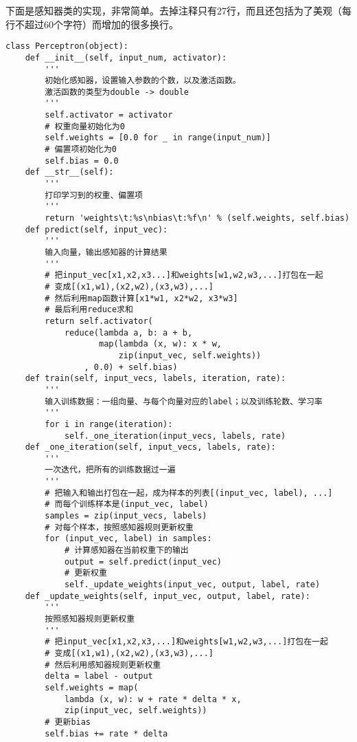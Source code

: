 下面是感知器类的实现，非常简单。去掉注释只有27行，而且还包括为了美观（每行不超过60个字符）而增加的很多换行。
\begin{lstlisting}
class Perceptron(object):
    def __init__(self, input_num, activator):
        '''
        初始化感知器，设置输入参数的个数，以及激活函数。
        激活函数的类型为double -> double
        '''
        self.activator = activator
        # 权重向量初始化为0
        self.weights = [0.0 for _ in range(input_num)]
        # 偏置项初始化为0
        self.bias = 0.0
    def __str__(self):
        '''
        打印学习到的权重、偏置项
        '''
        return 'weights\t:%s\nbias\t:%f\n' % (self.weights, self.bias)
    def predict(self, input_vec):
        '''
        输入向量，输出感知器的计算结果
        '''
        # 把input_vec[x1,x2,x3...]和weights[w1,w2,w3,...]打包在一起
        # 变成[(x1,w1),(x2,w2),(x3,w3),...]
        # 然后利用map函数计算[x1*w1, x2*w2, x3*w3]
        # 最后利用reduce求和
        return self.activator(
            reduce(lambda a, b: a + b,
                   map(lambda (x, w): x * w,  
                       zip(input_vec, self.weights))
                , 0.0) + self.bias)
    def train(self, input_vecs, labels, iteration, rate):
        '''
        输入训练数据：一组向量、与每个向量对应的label；以及训练轮数、学习率
        '''
        for i in range(iteration):
            self._one_iteration(input_vecs, labels, rate)
    def _one_iteration(self, input_vecs, labels, rate):
        '''
        一次迭代，把所有的训练数据过一遍
        '''
        # 把输入和输出打包在一起，成为样本的列表[(input_vec, label), ...]
        # 而每个训练样本是(input_vec, label)
        samples = zip(input_vecs, labels)
        # 对每个样本，按照感知器规则更新权重
        for (input_vec, label) in samples:
            # 计算感知器在当前权重下的输出
            output = self.predict(input_vec)
            # 更新权重
            self._update_weights(input_vec, output, label, rate)
    def _update_weights(self, input_vec, output, label, rate):
        '''
        按照感知器规则更新权重
        '''
        # 把input_vec[x1,x2,x3,...]和weights[w1,w2,w3,...]打包在一起
        # 变成[(x1,w1),(x2,w2),(x3,w3),...]
        # 然后利用感知器规则更新权重
        delta = label - output
        self.weights = map(
            lambda (x, w): w + rate * delta * x,
            zip(input_vec, self.weights))
        # 更新bias
        self.bias += rate * delta
\end{lstlisting}


